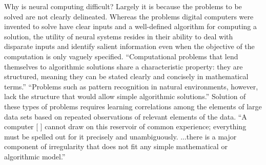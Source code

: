 



\vspace{3em}
Why is neural computing difficult? Largely it is because the problems to be solved are not clearly delineated. Whereas the problems digital computers were invented to solve have clear inputs and a well-defined algorithm for computing a solution, the utility of neural systems resides in their ability to deal with disparate inputs and identify salient information even when the objective of the computation is only vaguely specified. ``Computational problems that lend themselves to algorithmic solutions share a characteristic property: they are structured, meaning they can be stated clearly and concisely in mathematical terms.'' \cite{abps1987} ``Problems such as pattern recognition in natural environments, however, lack the structure that would allow simple algorithmic solutions.'' \cite{abps1987} Solution of these types of problems requires learning correlations among the elements of large data sets based on repeated observations of relevant elements of the data. ``A computer [ ] cannot draw on this reservoir of common experience; everything must be spelled out for it precisely and unambiguously. ...there is a major component of irregularity that does not fit any simple mathematical or algorithmic model.'' \cite{abps1987}

